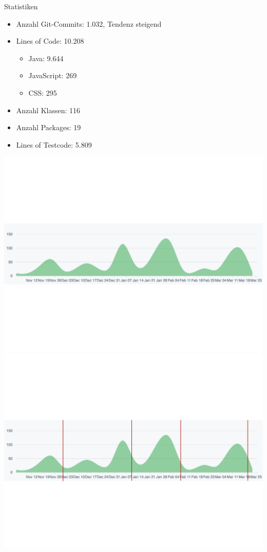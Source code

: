 \documentclass[10pt]{beamer}
\begin{document}
\begin{frame}{Statistiken}{}
	\begin{itemize}
		\item Anzahl Git-Commits: 1.032, Tendenz steigend
		\item Lines of Code: 10.208
		\begin{itemize}
			\item Java: 9.644
			\item JavaScript: 269
			\item CSS: 295
		\end{itemize}
		\item Anzahl Klassen: 116
		\item Anzahl Packages: 19
		\item Lines of Testcode: 5.809 
	\end{itemize}
	
	\begin{overprint}
    \includegraphics[width = \textwidth]{img/GitCommits}
    \includegraphics[width = \textwidth]{img/GitCommitsAbgabe}
    \end{overprint}
\end{frame}
\end{document}
